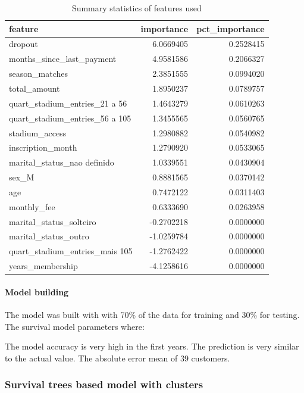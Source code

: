 \documentclass[
  12pt,
]{article}
\begin{document}
\begin{table}

\caption{\label{tab:summarytable2}Summary statistics of features used}
\centering
\begin{tabular}[t]{lrr}
\toprule
feature & importance & pct\_importance\\
\midrule
dropout & 6.0669405 & 0.2528415\\
months\_since\_last\_payment & 4.9581586 & 0.2066327\\
season\_matches & 2.3851555 & 0.0994020\\
total\_amount & 1.8950237 & 0.0789757\\
quart\_stadium\_entries\_21 a 56 & 1.4643279 & 0.0610263\\
\addlinespace
quart\_stadium\_entries\_56 a 105 & 1.3455565 & 0.0560765\\
stadium\_access & 1.2980882 & 0.0540982\\
inscription\_month & 1.2790920 & 0.0533065\\
marital\_status\_nao definido & 1.0339551 & 0.0430904\\
sex\_M & 0.8881565 & 0.0370142\\
\addlinespace
age & 0.7472122 & 0.0311403\\
monthly\_fee & 0.6333690 & 0.0263958\\
marital\_status\_solteiro & -0.2702218 & 0.0000000\\
marital\_status\_outro & -1.0259784 & 0.0000000\\
quart\_stadium\_entries\_mais 105 & -1.2762422 & 0.0000000\\
\addlinespace
years\_membership & -4.1258616 & 0.0000000\\
\bottomrule
\end{tabular}
\end{table}

\hypertarget{model-building}{%
\paragraph{Model building}\label{model-building}}

The model was built with with 70\% of the data for training and 30\% for testing.
The survival model parameters where:

The model accuracy is very high in the first years. The prediction is very
similar to the actual value. The absolute error mean of
39 customers.

\hypertarget{survival-trees-based-model-with-clusters}{%
\subsubsection{Survival trees based model with clusters}\label{survival-trees-based-model-with-clusters}}
\end{document}
